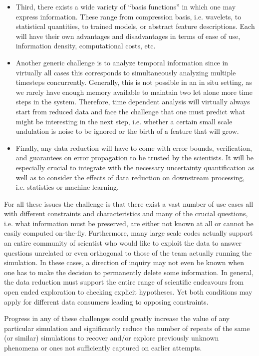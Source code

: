 \begin{itemize}
\item
Third, there exists a wide variety of “basis functions” in which one may express information. These range from compression basis, i.e. wavelets, to statistical quantities, to trained models, or abstract feature descriptions. Each will have their own advantages and disadvantages in terms of ease of use, information density, computational costs, etc.

\item
Another generic challenge is to analyze temporal information since in virtually all cases this corresponds to simultaneously analyzing multiple timesteps concurrently. Generally, this is not possible in an in situ setting, as we rarely have enough memory available to maintain two let alone more time steps in the system. Therefore, time dependent analysis will virtually always start from reduced data and face the challenge that one must predict what might be interesting in the next step, i.e. whether a certain small scale undulation is noise to be ignored or the birth of a feature that will grow. 

\item
Finally, any data reduction will have to come with error bounds, verification, and guarantees on error propagation to be trusted by the scientists. It will be especially crucial to integrate with the necessary uncertainty quantification as well as to consider the effects of data reduction on downstream processing, i.e. statistics or machine learning.
\end{itemize}

For all these issues the challenge is that there exist a vast number of use cases all with different constraints and characteristics and many of the crucial questions, i.e. what information must be preserved, are either not known at all or cannot be easily computed on-the-fly. Furthermore, many large scale codes actually support an entire community of scientist who would like to exploit the data to answer questions unrelated or even orthogonal to those of the team actually running the simulation. In these cases, a direction of inquiry may not even be known when one has to make the decision to permanently delete some information. In general, the data reduction must support the entire range of scientific endeavours from open ended exploration to checking explicit hypotheses. Yet both conditions may apply for different data consumers leading to opposing constraints.

Progress in any of these challenges could greatly increase the value of any particular simulation and significantly reduce the number of repeats of the same (or similar) simulations to recover and/or explore previously unknown phenomena or ones not sufficiently captured on earlier attempts. 


